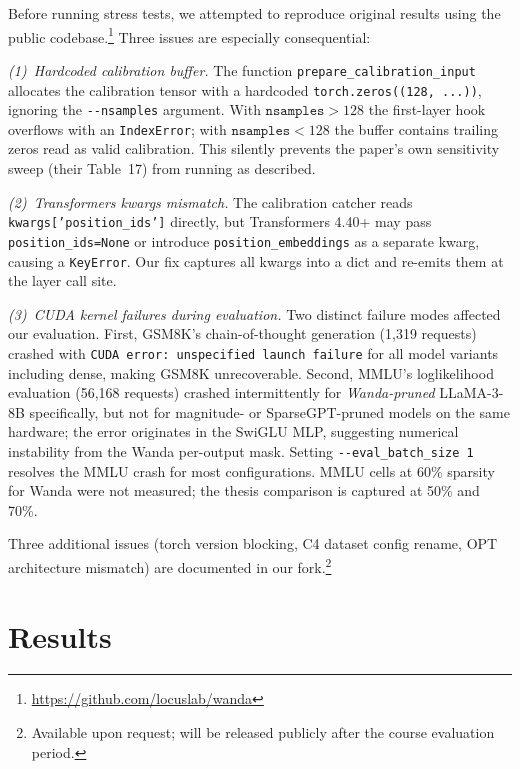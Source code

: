 \documentclass{article}
\begin{document}
Before running stress tests, we attempted to reproduce original results using the public codebase.\footnote{\url{https://github.com/locuslab/wanda}}
Three issues are especially consequential:

\emph{(1)~Hardcoded calibration buffer.}
The function \texttt{prepare\_calibration\_input} allocates the calibration tensor with a hardcoded \texttt{torch.zeros((128, ...))}, ignoring the \texttt{-{}-nsamples} argument.
With $\texttt{nsamples}>128$ the first-layer hook overflows with an \texttt{IndexError}; with $\texttt{nsamples}<128$ the buffer contains trailing zeros read as valid calibration.
This silently prevents the paper's own sensitivity sweep (their Table~17) from running as described.

\emph{(2)~Transformers kwargs mismatch.}
The calibration catcher reads \texttt{kwargs['position\_ids']} directly, but Transformers 4.40+ may pass \texttt{position\_ids=None} or introduce \texttt{position\_embeddings} as a separate kwarg, causing a \texttt{KeyError}.
Our fix captures all kwargs into a dict and re-emits them at the layer call site.

\emph{(3)~CUDA kernel failures during evaluation.}
Two distinct failure modes affected our evaluation.
First, GSM8K's chain-of-thought generation (1,319 requests) crashed with \texttt{CUDA error: unspecified launch failure} for all model variants including dense, making GSM8K unrecoverable.
Second, MMLU's loglikelihood evaluation (56,168 requests) crashed intermittently for \emph{Wanda-pruned} LLaMA-3-8B specifically, but not for magnitude- or SparseGPT-pruned models on the same hardware; the error originates in the SwiGLU MLP, suggesting numerical instability from the Wanda per-output mask.
Setting \texttt{-{}-eval\_batch\_size\,1} resolves the MMLU crash for most configurations.
MMLU cells at 60\% sparsity for Wanda were not measured; the thesis comparison is captured at 50\% and 70\%.

Three additional issues (torch version blocking, C4 dataset config rename, OPT architecture mismatch) are documented in our fork.\footnote{Available upon request; will be released publicly after the course evaluation period.}

\section{Results}
\label{sec:results}
\end{document}
